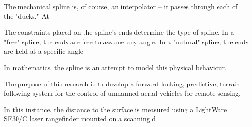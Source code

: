 \documentclass[10pt]{article}
\begin{document}
The mechanical spline is, of course, an interpolator -- it passes through each of the "ducks." At

The constraints placed on the spline's ends determine the type of spline. In a "free" spline, the ends are free to assume any angle. In a "natural" spline, the ends are held at a specific angle. 

In mathematics, the spline is an attempt to model this physical behaviour. 





The purpose of this research is to develop a forward-looking, predictive, terrain-following system for the control of unmanned aerial vehicles for remote sensing. 


In this instance, the distance to the surface is measured using a LightWare SF30/C laser rangefinder mounted on a scanning d





\newpage


\end{document}
